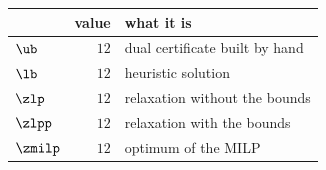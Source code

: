 \begin{center}\small
\begin{tabular}{lrl}
\toprule
 & value & what it is \\
\midrule
$\ub$ & $12$ & dual certificate built by hand \\
$\lb$ & $12$ & heuristic solution \\
$\zlp$ & $12$ & relaxation without the bounds \\
$\zlpp$ & $12$ & relaxation with the bounds \\
$\zmilp$ & $12$ & optimum of the MILP \\
\bottomrule
\end{tabular}
\end{center}
